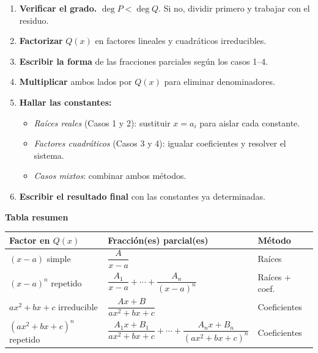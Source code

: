 \documentclass[12pt, letterpaper]{article}
\newenvironment{procedimiento}{%
  \begin{tcolorbox}[subcuadro, colback=purpuraclaro, colframe=purpura,
    coltitle=purpuratitulo, colbacktitle=purpuraclaro,
    title=Procedimiento general para hallar las constantes]
}{\end{tcolorbox}}
\begin{document}
\vspace{0.5cm}

\begin{procedimiento}
\begin{enumerate}[leftmargin=*, label=\textbf{\arabic*.}]
  \item \textbf{Verificar el grado.} $\deg P < \deg Q$. Si no, dividir primero y trabajar con el residuo.
  \item \textbf{Factorizar} $Q(x)$ en factores lineales y cuadr\'{a}ticos irreducibles.
  \item \textbf{Escribir la forma} de las fracciones parciales seg\'{u}n los casos 1--4.
  \item \textbf{Multiplicar} ambos lados por $Q(x)$ para eliminar denominadores.
  \item \textbf{Hallar las constantes:}
    \begin{itemize}
      \item \textit{Ra\'{i}ces reales} (Casos 1 y 2): sustituir $x = a_i$ para aislar cada constante.
      \item \textit{Factores cuadr\'{a}ticos} (Casos 3 y 4): igualar coeficientes y resolver el sistema.
      \item \textit{Casos mixtos}: combinar ambos m\'{e}todos.
    \end{itemize}
  \item \textbf{Escribir el resultado final} con las constantes ya determinadas.
\end{enumerate}
\end{procedimiento}

\vspace{0.5cm}

\begin{center}
{\bfseries\large Tabla resumen}\\[10pt]
\renewcommand{\arraystretch}{2}
\begin{tabular}{>{\centering\arraybackslash}m{4.8cm}
                >{\centering\arraybackslash}m{5.5cm}
                >{\centering\arraybackslash}m{3.2cm}}
  \toprule
  \textbf{Factor en } $Q(x)$ & \textbf{Fracci\'{o}n(es) parcial(es)} & \textbf{M\'{e}todo} \\
  \midrule
  $(x-a)$ simple
    & $\dfrac{A}{x-a}$
    & Ra\'{i}ces \\
  $(x-a)^n$ repetido
    & $\dfrac{A_1}{x-a}+\cdots+\dfrac{A_n}{(x-a)^n}$
    & Ra\'{i}ces + coef. \\
  $ax^2{+}bx{+}c$ irreducible
    & $\dfrac{Ax+B}{ax^2+bx+c}$
    & Coeficientes \\
  $(ax^2{+}bx{+}c)^n$ repetido
    & $\dfrac{A_1x+B_1}{ax^2+bx+c}+\cdots+\dfrac{A_nx+B_n}{(ax^2+bx+c)^n}$
    & Coeficientes \\
  \bottomrule
\end{tabular}
\end{center}
\end{document}
